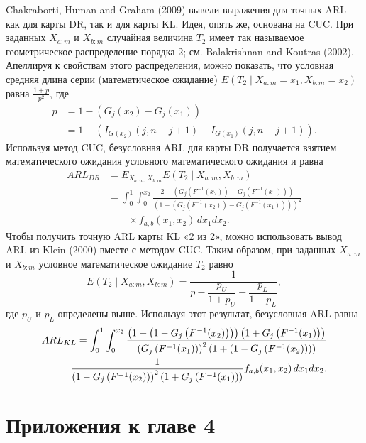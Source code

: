 Chakraborti, Human and Graham (2009) вывели выражения для точных ARL как для карты DR, так и для карты KL. Идея, опять же, основана на CUC. При заданных \(X_{a:m}\) и \(X_{b:m}\) случайная величина \(T_2\) имеет так называемое геометрическое распределение порядка 2; см. Balakrishnan and Koutras (2002). Апеллируя к свойствам этого распределения, можно показать, что условная средняя длина серии (математическое ожидание) \(E\left( T_2 \mid X_{a:m} = x_1, X_{b:m} = x_2 \right)\) равна \(\frac{1 + p}{p^2}\), где
\begin{align*}
	p &= 1 - \left( G_j(x_2) - G_j(x_1) \right) \\
	  &= 1 - \left( I_{G(x_2)}(j, n - j + 1) - I_{G(x_1)}(j, n - j + 1) \right).
\end{align*}
Используя метод CUC, безусловная ARL для карты DR получается взятием математического ожидания условного математического ожидания и равна
\begin{align*}
	ARL_{DR} &= E_{X_{a:m}, X_{b:m}} E\left( T_2 \mid X_{a:m}, X_{b:m} \right) \\
	         &= \int_{0}^{1}\int_{0}^{x_2} \frac{2 - \left( G_j\left( F^{-1}(x_2) \right) - G_j\left( F^{-1}(x_1) \right) \right)}{\left( 1 - \left( G_j\left( F^{-1}(x_2) \right) - G_j\left( F^{-1}(x_1) \right) \right) \right)^2} \\
	         &\qquad \times f_{a,b}(x_1, x_2)\, dx_1 dx_2.
\end{align*}
Чтобы получить точную ARL карты KL «2 из 2», можно использовать вывод ARL из Klein (2000) вместе с методом CUC. Таким образом, при заданных \(X_{a:m}\) и \(X_{b:m}\) условное математическое ожидание \(T_2\) равно
\[
	E\left( T_2 \mid X_{a:m}, X_{b:m} \right) = \frac{1}{p - \dfrac{p_U}{1 + p_U} - \dfrac{p_L}{1 + p_L}},
\]
где \(p_U\) и \(p_L\) определены выше. Используя этот результат, безусловная ARL равна
\[
	\begin{aligned}
		ARL_{KL} = \int_{0}^{1}\int_{0}^{x_2}
		\frac{\left( 1 + \left( 1 - G_j\left( F^{-1}(x_2) \right) \right) \right)
			\left( 1 + G_j\left( F^{-1}(x_1) \right) \right)}{%
			\left( G_j\left( F^{-1}(x_1) \right) \right)^2
			\left( 1 + \left( 1 - G_j\left( F^{-1}(x_2) \right) \right) \right)} \\
		\frac{1}{\left( 1 - G_j\left( F^{-1}(x_2) \right) \right)^2
			\left( 1 + G_j\left( F^{-1}(x_1) \right) \right)}
		f_{a,b}(x_1, x_2)\, dx_1 dx_2.
	\end{aligned}
\]


\section{Приложения к главе 4}
